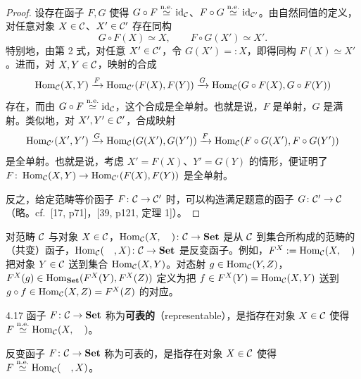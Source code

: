 \begin{proof}
设存在函子 $F,G$ 使得 $G\circ F\overset{\mathrm{n.e.}}{\simeq}\mathrm{id}_{\mathcal{C}}$、$F\circ G\overset{\mathrm{n.e.}}{\simeq}\mathrm{id}_{\mathcal{C}'}$。由自然同值的定义，对任意对象 $X\in\mathcal{C}$、$X'\in\mathcal{C}'$ 存在同构
\[ G\circ F(X)\simeq X,\qquad F\circ G(X')\simeq X'. \]
特别地，由第 2 式，对任意 $X'\in\mathcal{C}'$，令 $G(X')=:X$，即得同构 $F(X)\simeq X'$。进而，对 $X,Y\in\mathcal{C}$，映射的合成
\[ \operatorname{Hom}_{\mathcal{C}}(X,Y)\xrightarrow{F}\operatorname{Hom}_{\mathcal{C}'}(F(X),F(Y))\xrightarrow{G}\operatorname{Hom}_{\mathcal{C}}(G\circ F(X),G\circ F(Y)) \]
存在，而由 $G\circ F\overset{\mathrm{n.e.}}{\simeq}\mathrm{id}_{\mathcal{C}}$，这个合成是全单射。也就是说，$F$ 是单射，$G$ 是满射。类似地，对 $X',Y'\in\mathcal{C}'$，合成映射
\[ \operatorname{Hom}_{\mathcal{C}'}(X',Y')\xrightarrow{G}\operatorname{Hom}_{\mathcal{C}}(G(X'),G(Y'))\xrightarrow{F}\operatorname{Hom}_{\mathcal{C}}(F\circ G(X'),F\circ G(Y')) \]
是全单射。也就是说，考虑 $X'=F(X)$、$Y'=G(Y)$ 的情形，便证明了 $F\colon\operatorname{Hom}_{\mathcal{C}}(X,Y)\to\operatorname{Hom}_{\mathcal{C}'}(F(X),F(Y))$ 是全单射。

反之，给定范畴等价函子 $F\colon\mathcal{C}\to\mathcal{C}'$ 时，可以构造满足题意的函子 $G\colon\mathcal{C}'\to\mathcal{C}$（略。cf.\ [17, p71]，[39, p121, 定理 1]）。
\end{proof}

对范畴 $\mathcal{C}$ 与对象 $X\in\mathcal{C}$，$\operatorname{Hom}_{\mathcal{C}}(X,\quad)\colon\mathcal{C}\to\mathbf{Set}$ 是从 $\mathcal{C}$ 到集合所构成的范畴的（共变）函子，$\operatorname{Hom}_{\mathcal{C}}(\quad,X)\colon\mathcal{C}\to\mathbf{Set}$ 是反变函子。例如，$F^X:=\operatorname{Hom}_{\mathcal{C}}(X,\quad)$ 把对象 $Y\in\mathcal{C}$ 送到集合 $\operatorname{Hom}_{\mathcal{C}}(X,Y)$。对态射 $g\in\operatorname{Hom}_{\mathcal{C}}(Y,Z)$，$F^X(g)\in\operatorname{Hom}_{\mathbf{Set}}(F^X(Y),F^X(Z))$ 定义为把 $f\in F^X(Y)=\operatorname{Hom}_{\mathcal{C}}(X,Y)$ 送到 $g\circ f\in\operatorname{Hom}_{\mathcal{C}}(X,Z)=F^X(Z)$ 的对应。

\begin{definition}{4.17}
函子 $F\colon\mathcal{C}\to\mathbf{Set}$ 称为\textbf{可表的}（representable），是指存在对象 $X\in\mathcal{C}$ 使得 $F\overset{\mathrm{n.e.}}{\simeq}\operatorname{Hom}_{\mathcal{C}}(X,\quad)$。

反变函子 $F\colon\mathcal{C}\to\mathbf{Set}$ 称为可表的，是指存在对象 $X\in\mathcal{C}$ 使得 $F\overset{\mathrm{n.e.}}{\simeq}\operatorname{Hom}_{\mathcal{C}}(\quad,X)$。
\end{definition}


